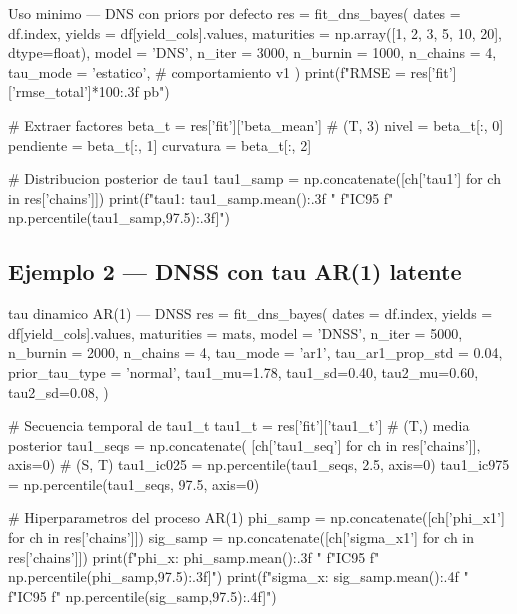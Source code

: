 \documentclass[12pt, a4paper]{article}
\theoremstyle{plain}
\theoremstyle{definition}
\theoremstyle{remark}
\begin{document}
\begin{codigocaja}{Uso minimo --- DNS con priors por defecto}
res = fit_dns_bayes(
    dates      = df.index,
    yields     = df[yield_cols].values,
    maturities = np.array([1, 2, 3, 5, 10, 20], dtype=float),
    model      = 'DNS',
    n_iter     = 3000,
    n_burnin   = 1000,
    n_chains   = 4,
    tau_mode   = 'estatico',   # comportamiento v1
)
print(f"RMSE = {res['fit']['rmse_total']*100:.3f} pb")

# Extraer factores
beta_t    = res['fit']['beta_mean']   # (T, 3)
nivel     = beta_t[:, 0]
pendiente = beta_t[:, 1]
curvatura = beta_t[:, 2]

# Distribucion posterior de tau1
tau1_samp = np.concatenate([ch['tau1'] for ch in res['chains']])
print(f"tau1: {tau1_samp.mean():.3f}  "
      f"IC95%
      f" {np.percentile(tau1_samp,97.5):.3f}]")
\end{codigocaja}

\subsection{Ejemplo 2 --- DNSS con tau AR(1) latente}

\begin{codigocaja}{tau dinamico AR(1) --- DNSS}
res = fit_dns_bayes(
    dates      = df.index,
    yields     = df[yield_cols].values,
    maturities = mats,
    model      = 'DNSS',
    n_iter     = 5000,
    n_burnin   = 2000,
    n_chains   = 4,
    tau_mode         = 'ar1',
    tau_ar1_prop_std = 0.04,
    prior_tau_type   = 'normal',
    tau1_mu=1.78, tau1_sd=0.40,
    tau2_mu=0.60, tau2_sd=0.08,
)

# Secuencia temporal de tau1_t
tau1_t    = res['fit']['tau1_t']       # (T,) media posterior
tau1_seqs = np.concatenate(
    [ch['tau1_seq'] for ch in res['chains']], axis=0)   # (S, T)
tau1_ic025 = np.percentile(tau1_seqs, 2.5,  axis=0)
tau1_ic975 = np.percentile(tau1_seqs, 97.5, axis=0)

# Hiperparametros del proceso AR(1)
phi_samp = np.concatenate([ch['phi_x1'] for ch in res['chains']])
sig_samp = np.concatenate([ch['sigma_x1'] for ch in res['chains']])
print(f"phi_x:   {phi_samp.mean():.3f}  "
      f"IC95%
      f" {np.percentile(phi_samp,97.5):.3f}]")
print(f"sigma_x: {sig_samp.mean():.4f}  "
      f"IC95%
      f" {np.percentile(sig_samp,97.5):.4f}]")
\end{codigocaja}
\end{document}
